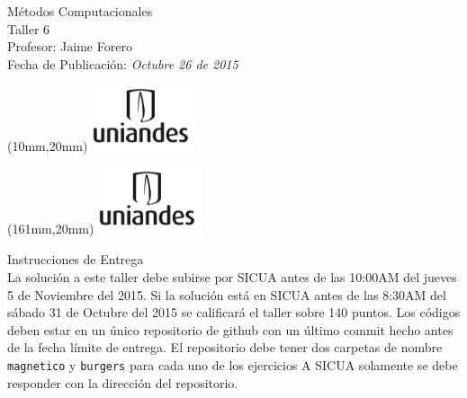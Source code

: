 \documentclass[11pt,letterpaper]{exam}
\begin{document}
\begin{center}
{\Large Métodos Computacionales} \\
Taller 6 \\
Profesor: Jaime Forero\\
Fecha de Publicación: {\small \it Octubre 26 de 2015}\\
\end{center}

\begin{textblock*}{40mm}(10mm,20mm)
  \includegraphics[width=3cm]{logoUniandes.png}
\end{textblock*}

\begin{textblock*}{40mm}(161mm,20mm)
  \includegraphics[width=3cm]{logoUniandes.png}
\end{textblock*}

\vspace{0.5cm}

{\Large Instrucciones de Entrega}\\

\noindent
La solución a este taller debe subirse por SICUA antes de las 10:00AM
del jueves 5 de Noviembre del 2015. 
\noindent
Si la soluci\'on est\'a en SICUA
antes de las 8:30AM del s\'abado 31 de Octubre del 2015 se calificar\'a
el taller sobre 140 puntos. 
\noindent
Los c\'odigos deben estar en un \'unico repositorio de github con un
\'ultimo commit hecho antes de la fecha l\'imite de entrega. El
repositorio debe tener dos carpetas de nombre \verb"magnetico" y
\verb"burgers" para cada uno de los ejercicios A SICUA
solamente se debe responder con la direcci\'on del repositorio.
\end{document}
